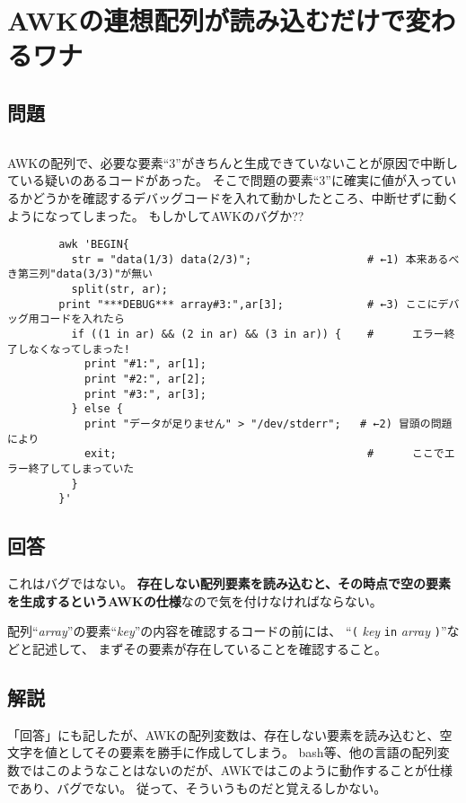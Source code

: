 \section{AWKの連想配列が読み込むだけで変わるワナ}

\subsection*{問題}
\noindent
$\!\!\!\!\!$
\begin{grshfboxit}{160.0mm}
	AWKの配列で、必要な要素``3''がきちんと生成できていないことが原因で中断している疑いのあるコードがあった。
	そこで問題の要素``3''に確実に値が入っているかどうかを確認するデバッグコードを入れて動かしたところ、中断せずに動くようになってしまった。
	もしかしてAWKのバグか??
	\begin{verbatim}
		awk 'BEGIN{
		  str = "data(1/3) data(2/3)";                  # ←1) 本来あるべき第三列"data(3/3)"が無い
		  split(str, ar);
		print "***DEBUG*** array#3:",ar[3];             # ←3) ここにデバッグ用コードを入れたら
		  if ((1 in ar) && (2 in ar) && (3 in ar)) {    #      エラー終了しなくなってしまった!
		    print "#1:", ar[1];
		    print "#2:", ar[2];
		    print "#3:", ar[3];
		  } else {
		    print "データが足りません" > "/dev/stderr";   # ←2) 冒頭の問題により
		    exit;                                       #      ここでエラー終了してしまっていた
		  }
		}'
	\end{verbatim}
\end{grshfboxit}

\subsection*{回答}
これはバグではない。
\textbf{存在しない配列要素を読み込むと、その時点で空の要素を生成するというAWKの仕様}なので気を付けなければならない。

配列``\textit{array}''の要素``\textit{key}''の内容を確認するコードの前には、
``\verb|(| \textit{key} \verb|in| \textit{array} \verb|)|''などと記述して、
まずその要素が存在していることを確認すること。

\subsection*{解説}

「回答」にも記したが、AWKの配列変数は、存在しない要素を読み込むと、空文字を値としてその要素を勝手に作成してしまう。
bash等、他の言語の配列変数ではこのようなことはないのだが、AWKではこのように動作することが仕様であり、バグでない。
従って、そういうものだと覚えるしかない。


